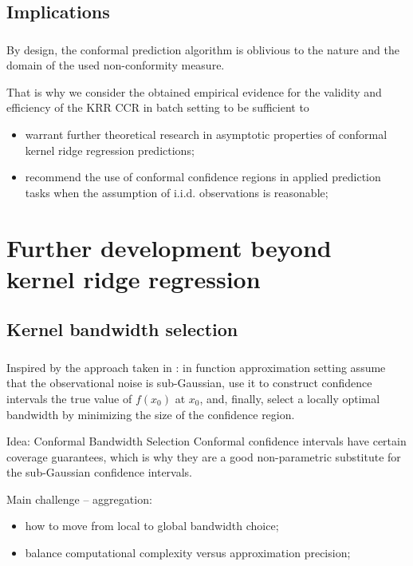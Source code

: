 \documentclass[t]{beamer}  %
\begin{document}

\subsection{Implications} %
\label{sub:implications}

\begin{frame}[c]\frametitle{\insertsection}
  \framesubtitle{\insertsubsection}
  By design, the conformal prediction algorithm is oblivious to the nature and
  the domain of the used non-conformity measure.

  That is why we consider the obtained empirical evidence for the validity and
  efficiency of the KRR CCR in batch setting to be sufficient to \begin{itemize}
    \item warrant further theoretical research in asymptotic properties of conformal
    kernel ridge regression predictions;
    \item recommend the use of conformal confidence regions in applied prediction
    tasks when the assumption of i.i.d. observations is reasonable;
  \end{itemize}
\end{frame}



\section{Further development beyond kernel ridge regression} %
\label{sec:further_development_beyond_krr}

\subsection{Kernel bandwidth selection} %
\label{sub:kernel_bandwidth_selection}

\begin{frame}[t]\frametitle{\insertsection}
  \framesubtitle{\insertsubsection}
  Inspired by the approach taken in \cite{goldenshluger1997}: in function approximation
  setting assume that the observational noise is sub-Gaussian, use it to construct
  confidence intervals the true value of $f(x_0)$ at $x_0$, and, finally, select
  a locally optimal bandwidth by minimizing the size of the confidence region. 

  \begin{block}{Idea: Conformal Bandwidth Selection}
    Conformal confidence intervals have certain coverage guarantees, which is
    why they are a good non-parametric substitute for the sub-Gaussian confidence 
    intervals.

    Main challenge -- aggregation: \begin{itemize}
      \item how to move from local to global bandwidth choice;
      \item balance computational complexity versus approximation precision;
    \end{itemize}
  \end{block}
\end{frame}
\end{document}
